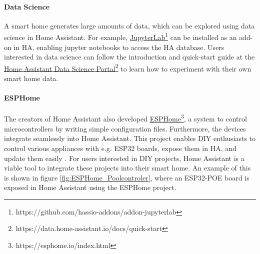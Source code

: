 \newpage

\paragraph{Data Science}
A smart home generates large amounts of data, which can be explored using data science in Home Assistant. For example, \href{https://github.com/hassio-addons/addon-jupyterlab}{JupyterLab}\footnote{https://github.com/hassio-addons/addon-jupyterlab} can be installed as an add-on in HA, enabling jupyter notebooks to access the HA database. Users interested in data science can follow the introduction and quick-start guide at the \href{https://data.home-assistant.io/docs/quick-start}{Home Assistant Data Science Portal}\footnote{https://data.home-assistant.io/docs/quick-start} to learn how to experiment with their own smart home data.

\paragraph{ESPHome}
The creators of Home Assistant also developed \href{https://esphome.io/index.html}{ESPHome}\footnote{https://esphome.io/index.html}, a system to control microcontrollers by writing simple configuration files. Furthermore, the devices integrate seamlessly into Home Assistant. This project enables DIY enthusiasts to control various appliances with e.g. ESP32 boards, expose them in HA, and update them easily \cite{ESPHome_Startpage}. For users interested in DIY projects, Home Assistant is a viable tool to integrate these projects into their smart home. An example of this is shown in figure \ref{fig:ESPHome_Poolcontroler}, where an ESP32-POE board is exposed in Home Assistant using the ESPHome project.

